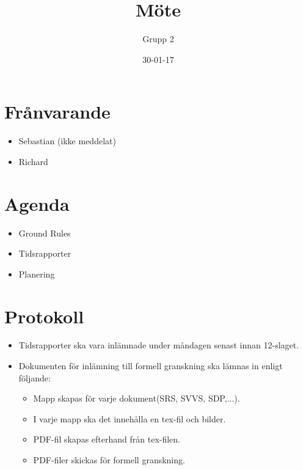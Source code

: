 \documentclass[paper=a4, fontsize=11pt,twoside]{article}
\title{Möte}
\author{Grupp 2}
\date{30-01-17}
\begin{document}
\maketitle	

\section{Frånvarande}
\begin{itemize}
  \item Sebastian (ikke meddelat)
  \item Richard
\end{itemize}

\section{Agenda}

\begin{itemize}
  \item Ground Rules
  \item Tidsrapporter
  \item Planering
\end{itemize}

\section{Protokoll}

\begin{itemize}
  \item Tidsrapporter ska vara inlämnade under måndagen senast innan 12-slaget.
  \item Dokumenten för inlämning till formell granskning ska lämnas in enligt
  följande:
	\begin{itemize}
    \item Mapp skapas för varje dokument(SRS, SVVS, SDP,...).
    \item I varje mapp ska det innehålla en tex-fil och bilder.
    \item PDF-fil skapas efterhand från tex-filen.
    \item PDF-filer skickas för formell granskning.
	\end{itemize}
\end{itemize}
\end{document}
